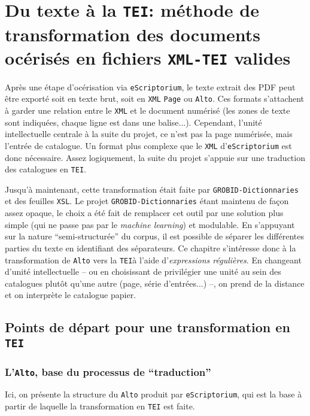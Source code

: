 \documentclass[a4paper, 12pt, twoside]{book}
\newcommand{\alto}{\texttt{Alto}}
\newcommand{\escr}{\texttt{eScriptorium}}
\newcommand{\rgx}{\textit{expressions régulières}}
\newcommand{\tei}{\texttt{TEI}}
\newcommand{\xml}{\texttt{XML}}
\newcommand{\xmltei}{\texttt{XML-TEI}}
\newcommand{\xsl}{\texttt{XSL}}
\begin{document}


\chapter{Du texte à la \tei{}: méthode de transformation des documents océrisés en fichiers \xmltei{} valides}
\chaptermark{Du texte à la \tei{}}
Après une étape d'océrisation via \escr{}, le texte extrait des PDF peut être exporté soit en texte brut, soit en \xml{} \texttt{Page} ou \alto{}. Ces formats s'attachent à garder une relation entre le \xml{} et le document numérisé (les zones de texte sont indiquées, chaque ligne est dans une balise...). Cependant, l'unité intellectuelle centrale à la suite du projet, ce n'est pas la page numérisée, mais l'entrée de catalogue. Un format plus complexe que le \xml{} d'\escr{} est donc nécessaire. Assez logiquement, la suite du projet s'appuie sur une traduction des catalogues en \tei{}. 

Jusqu'à maintenant, cette transformation était faite par \texttt{GROBID-Dictionnaries} et des feuilles \xsl{}. Le projet \texttt{GROBID-Dictionnaries} étant maintenu de façon assez opaque, le choix a été fait de remplacer cet outil par une solution plus simple (qui ne passe pas par le \textit{machine learning}) et modulable. En s'appuyant sur la nature \enquote{semi-structurée} du corpus, il est possible de séparer les différentes parties du texte en identifiant des séparateurs. Ce chapitre s'intéresse donc à la transformation de \alto{} vers la \tei{}à l'aide d'\rgx{}. En changeant d'unité intellectuelle -- ou en choisissant de privilégier une unité au sein des catalogues plutôt qu'une autre (page, série d'entrées...) --, on prend de la distance et on interprète le catalogue papier.

\section{Points de départ pour une transformation en \tei{}}

\subsection{L'\alto{}, base du processus de \enquote{traduction}}
Ici, on présente la structure du \alto{} produit par \escr{}, qui est la base à partir de laquelle la transformation en \tei{} est faite.
\end{document}
